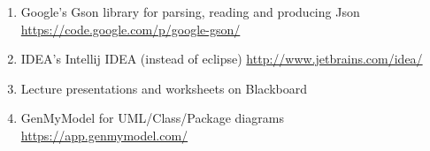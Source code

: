 \documentclass[a4paper, 11pt]{article}
\begin{document}
\begin{enumerate}
\item Google's Gson library for parsing, reading and producing Json \url{https://code.google.com/p/google-gson/}
\item IDEA's Intellij IDEA (instead of eclipse) \url{http://www.jetbrains.com/idea/} 
\item Lecture presentations and worksheets on Blackboard
\item GenMyModel for UML/Class/Package diagrams \url{https://app.genmymodel.com/}
\end{enumerate}
\end{document}
